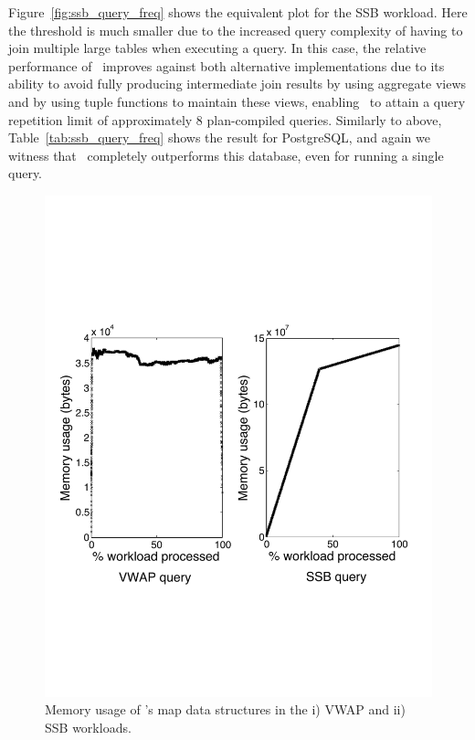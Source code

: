 Figure~\ref{fig:ssb_query_freq} shows the equivalent plot for the SSB workload.
Here the threshold is much smaller due to the increased query complexity of
having to join multiple large tables when executing a query. In this case, the
relative performance of \compiler\ improves against both alternative
implementations due to its ability to avoid fully producing intermediate join
results by using aggregate views and by using tuple functions to maintain these
views, enabling \compiler\ to attain a query repetition limit of approximately 8
plan-compiled queries. Similarly to above, Table~\ref{tab:ssb_query_freq} shows
the result for PostgreSQL, and again we witness that \compiler\ completely
outperforms this database, even for running a single query. 


\begin{figure}[htbp]
\begin{center}
\includegraphics[scale=0.3]{../plots/mem_usage}
\end{center}
\caption{Memory usage of \compiler's map data structures in the i) VWAP and ii)
SSB workloads.}
\label{fig:memusage}
\end{figure}

